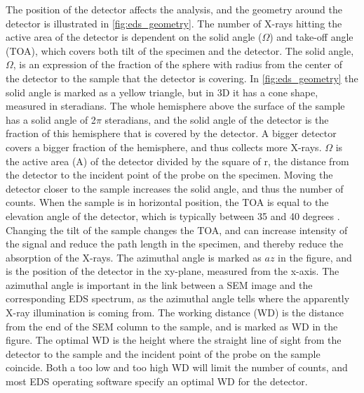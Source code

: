 The position of the detector affects the analysis, and the geometry around the detector is illustrated in \cref{fig:eds_geometry}.
The number of X-rays hitting the active area of the detector is dependent on the solid angle ($\Omega$) and take-off angle (TOA), which covers both tilt of the specimen and the detector.
The solid angle, $\Omega$, is an expression of the fraction of the sphere with radius from the center of the detector to the sample that the detector is covering.
In \cref{fig:eds_geometry} the solid angle is marked as a yellow triangle, but in 3D it has a cone shape, measured in steradians.
The whole hemisphere above the surface of the sample has a solid angle of 2$\pi$ steradians, and the solid angle of the detector is the fraction of this hemisphere that is covered by the detector.
A bigger detector covers a bigger fraction of the hemisphere, and thus collects more X-rays.
$\Omega$ is the active area (A) of the detector divided by the square of r, the distance from the detector to the incident point of the probe on the specimen.
Moving the detector closer to the sample increases the solid angle, and thus the number of counts.
When the sample is in horizontal position, the TOA is equal to the elevation angle of the detector, which is typically between 35 and 40 degrees \cite{dtsaii_1_getting_started}.
Changing the tilt of the sample changes the TOA, and can increase intensity of the signal and reduce the path length in the specimen, and thereby reduce the absorption of the X-rays.
The azimuthal angle is marked as $az$ in the figure, and is the position of the detector in the xy-plane, measured from the x-axis.
The azimuthal angle is important in the link between a SEM image and the corresponding EDS spectrum, as the azimuthal angle tells where the apparently X-ray illumination is coming from.
The working distance (WD) is the distance from the end of the SEM column to the sample, and is marked as WD in the figure.
The optimal WD is the height where the straight line of sight from the detector to the sample and the incident point of the probe on the sample coincide.
Both a too low and too high WD will limit the number of counts, and most EDS operating software specify an optimal WD for the detector.




